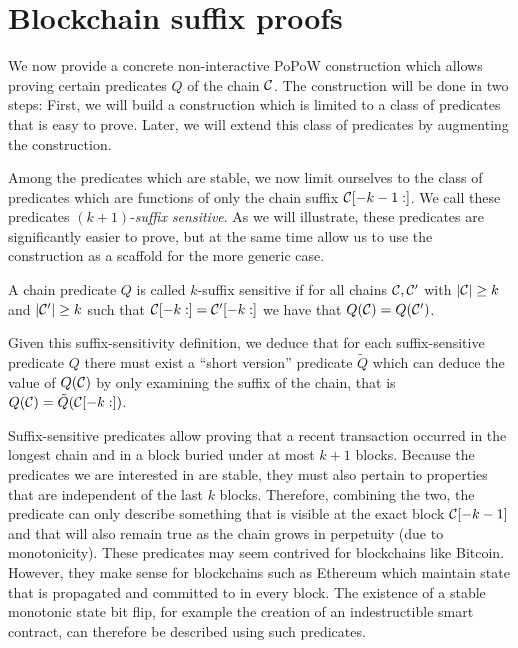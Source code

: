 \section{Blockchain suffix proofs}

We now provide a concrete non-interactive PoPoW construction which allows
proving certain predicates $Q$ of the chain $\mathcal{C}$. The construction will
be done in two steps: First, we will build a construction which is limited to
a class of predicates that is easy to prove. Later, we will extend this class
of predicates by augmenting the construction.

Among the predicates which are stable, we now limit ourselves to the class of
predicates which are functions of only the chain suffix $\mathcal{C}[-k - 1:]$. We
call these predicates $(k+1)$-\textit{suffix sensitive}. As we will illustrate,
these predicates are significantly easier to prove, but at the same time allow
us to use the construction as a scaffold for the more generic case.

\begin{definition}
A chain predicate $Q$ is called $k$-\textnormal{suffix sensitive} if for all
chains $\mathcal{C}, \mathcal{C}'$ with $|\mathcal{C}| \geq k$ and $|\mathcal{C}'| \geq k$ such that
$\mathcal{C}[-k:] = \mathcal{C}'[-k:]$ we have that $Q(\mathcal{C}) = Q(\mathcal{C}')$.
\end{definition}

Given this suffix-sensitivity definition, we deduce that for each
suffix-sensitive predicate $Q$ there must exist a ``short version'' predicate
$\tilde{Q}$ which can deduce the value of $Q(\mathcal{C})$ by only examining the
suffix of the chain, that is $Q(\mathcal{C}) = \tilde{Q}(\mathcal{C}[-k:])$.

Suffix-sensitive predicates allow proving that a recent transaction occurred in
the longest chain and in a block buried under at most $k + 1$ blocks. Because
the predicates we are interested in are stable, they must also pertain to
properties that are independent of the last $k$ blocks. Therefore, combining the
two, the predicate can only describe something that is visible at the exact
block $\mathcal{C}[-k-1]$ and that will also remain true as the chain grows in
perpetuity (due to monotonicity). These predicates may seem contrived for
blockchains like Bitcoin. However, they make sense for blockchains such as
Ethereum which maintain state \cite{vitalik} that is propagated and committed to
in every block. The existence of a stable monotonic state bit flip, for example
the creation of an indestructible smart contract, can therefore be described
using such predicates.

